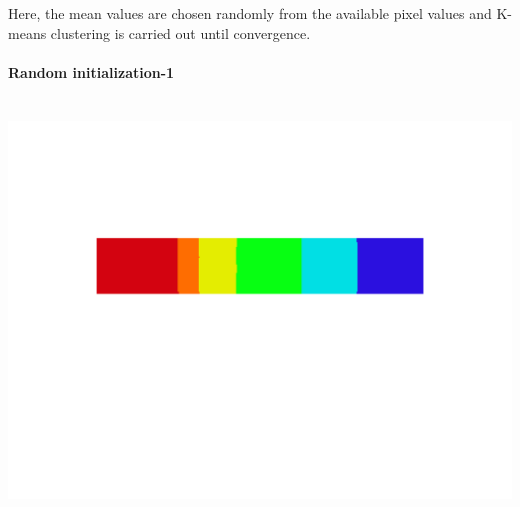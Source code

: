 \documentclass[fleqn]{article}
\newcommand{\myparagraph}[1]{\paragraph{#1}\mbox{}\\}
\begin{document}
Here, the mean values are chosen randomly from the available pixel values and K-means clustering is carried out until convergence.

\myparagraph{Random initialization-1}

\includegraphics[scale=0.4]{./pics/task1and2/spectrum_k=7_random1/K=7_iteration_10_random_7_spectrum.png}\\ 
\end{document}
